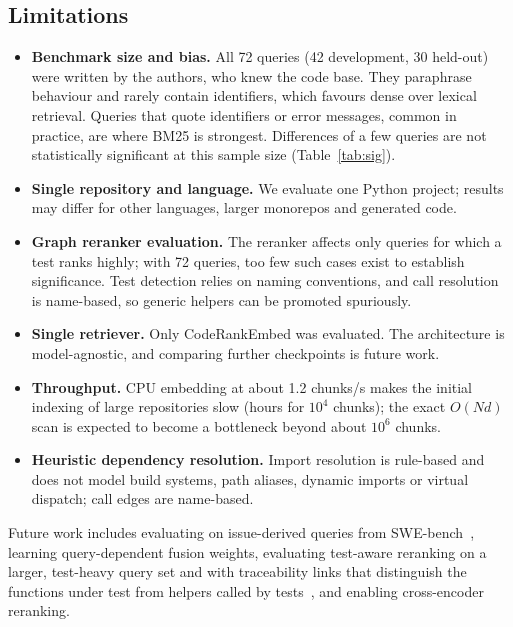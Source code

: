 \documentclass[conference]{IEEEtran}
\begin{document}
\subsection{Limitations}
\begin{itemize}
  \item \textbf{Benchmark size and bias.} All 72 queries (42 development,
        30 held-out) were written by the authors, who knew the code base. They paraphrase behaviour and rarely
        contain identifiers, which favours dense over lexical retrieval. Queries
        that quote identifiers or error messages, common in practice, are where
        BM25 is strongest. Differences of a few queries are not statistically
        significant at this sample size (Table~\ref{tab:sig}).
  \item \textbf{Single repository and language.} We evaluate one Python
        project; results may differ for other languages, larger monorepos and
        generated code.
  \item \textbf{Graph reranker evaluation.} The reranker affects only queries
        for which a test ranks highly; with 72 queries, too few such cases exist
        to establish significance. Test detection relies on naming conventions,
        and call resolution is name-based, so generic helpers can be promoted
        spuriously.
  \item \textbf{Single retriever.} Only CodeRankEmbed was evaluated. The
        architecture is model-agnostic, and comparing further checkpoints is
        future work.
  \item \textbf{Throughput.} CPU embedding at about 1.2 chunks/s makes the
        initial indexing of large repositories slow (hours for $10^4$ chunks);
        the exact $O(Nd)$ scan is expected to become a bottleneck beyond about $10^6$ chunks.
  \item \textbf{Heuristic dependency resolution.} Import resolution is
        rule-based and does not model build systems, path aliases, dynamic
        imports or virtual dispatch; call edges are name-based.
\end{itemize}
Future work includes evaluating on issue-derived queries from
SWE-bench~\cite{jimenez2024swebench}, learning query-dependent fusion weights,
evaluating test-aware reranking on a larger, test-heavy query set and with
traceability links that distinguish the functions under test from helpers
called by tests~\cite{white2022tctracer}, and enabling cross-encoder reranking.
\end{document}
